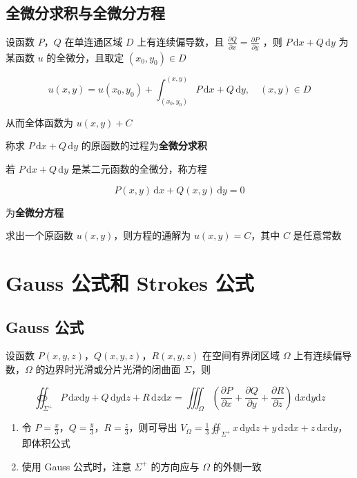 \documentclass[lang = zh , final , oneside , openany , titlepage , zihao = -4 , linespread = 1.3 , baselineskip = false , cjk-font = windows , text-font = newtx , math-font = newtx , math-style = ISO , uppercase-greek = upright , integral-limits = false]{sjtureport}
\begin{document}
\subsection{全微分求积与全微分方程}

设函数 \(P\)，\(Q\) 在单连通区域 \(D\) 上有连续偏导数，且
\(\displaystyle \frac{\partial Q}{\partial x} = \frac{\partial P}{\partial y}\)
，则 \(\displaystyle P\,\mathrm{d}x +Q\,\mathrm{d}y\) 为某函数 \(u\)
的全微分，且取定 \((x_0,y_0)\in D\)

\[u(x,y) = u(x_0,y_0) + \int_{(x_0,y_0)}^{(x,y)} P\,\mathrm{d}x +Q\,\mathrm{d}y,\quad (x,y)\in D\]

从而全体函数为 \(u(x,y) + C\)

称求 \(P\,\mathrm{d}x +Q\,\mathrm{d}y\)
的原函数的过程为\textbf{全微分求积}

若 \(P\,\mathrm{d}x +Q\,\mathrm{d}y\) 是某二元函数的全微分，称方程

\[P(x,y)\,\mathrm{d}x +Q(x,y)\,\mathrm{d}y = 0\]

为\textbf{全微分方程}

求出一个原函数 \(u(x,y)\)，则方程的通解为 \(u(x,y) = C\)，其中 \(C\)
是任意常数

\section{Gauss 公式和 Strokes 公式}

\subsection{Gauss 公式}

\begin{theorem}
    设函数 \(P(x,y,z)\)，\(Q(x,y,z)\)，\(R(x,y,z)\) 在空间有界闭区域
\(\Omega\) 上有连续偏导数，\(\Omega\) 的边界时光滑或分片光滑的闭曲面
\(\Sigma\)，则

\[\oiint_{\Sigma^+} P\,\mathrm{d}x\mathrm{d}y + Q\,\mathrm{d}y\mathrm{d}z + R\,\mathrm{d}z\mathrm{d}x = \iiint_\Omega \left(\frac{\partial P}{\partial x} + \frac{\partial Q}{\partial y} + \frac{\partial R}{\partial z}\right)\,\mathrm{d}x\mathrm{d}y\mathrm{d}z\]
\end{theorem}

\begin{enumerate}
\item
  令 \(P=\frac{x}{3}\)，\(Q=\frac{y}{3}\)，\(R=\frac{z}{3}\)，则可导出
  \(\displaystyle V_\Omega = \frac{1}{3}\oiint_{\Sigma^+} x\,\mathrm{d}y\mathrm{d}z + y\,\mathrm{d}z\mathrm{d}x + z\,\mathrm{d}x\mathrm{d}y\)，即体积公式
\item
  使用 Gauss 公式时，注意 \(\Sigma^+\) 的方向应与 \(\Omega\) 的外侧一致
\end{enumerate}
\end{document}
